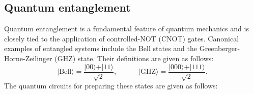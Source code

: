 \documentclass[a4paper,twocolumn,11pt,unpublished]{quantumarticle}
\numberwithin{equation}{section}
\begin{document}
\subsection{Quantum entanglement}
Quantum entanglement is a fundamental feature of quantum mechanics and is closely tied to the application of controlled-NOT (CNOT) gates. Canonical examples of entangled systems include the Bell states and the Greenberger-Horne-Zeilinger (GHZ) state. Their definitions are given as follows:
$$
\vert \mathrm{Bell} \rangle = \frac{\vert 00 \rangle + \vert 11 \rangle}{\sqrt{2}},\quad \qquad \vert \mathrm{GHZ} \rangle = \frac{\vert 000 \rangle + \vert 111 \rangle}{\sqrt{2}}.
$$
The quantum circuits for preparing these states are given as follows:
\begin{center}
\end{center}
\begin{center}
\end{center}
\end{document}
